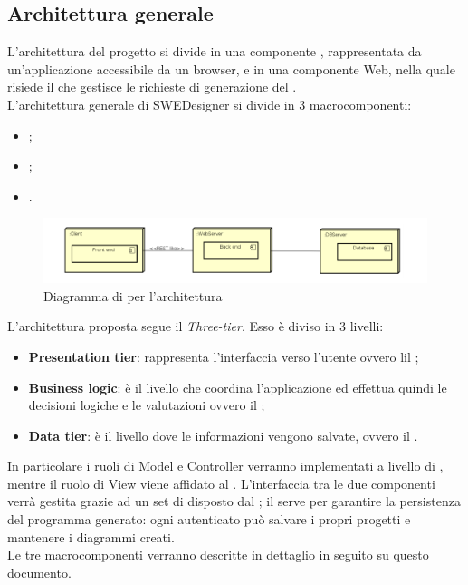 	\subsection{Architettura generale}
	\label{3.2}
	L'architettura del progetto si divide in una componente , rappresentata da un'applicazione
 accessibile da un browser, e in una componente Web, nella quale risiede il  che gestisce le richieste di generazione del .\\
L'architettura generale di SWEDesigner si divide in 3 macrocomponenti:
\begin{itemize}
\item \textbf{};
\item \textbf{ };
\item \textbf{}.
\end{itemize}

 \begin{figure}[h!]
\centering
\includegraphics[scale=0.4]{Disegnetti/architetturaGenerale.png}
\caption{Diagramma di  per l'architettura}
 \end{figure}

L'architettura proposta segue il  \emph{Three-tier}. Esso è diviso in 3 livelli: 
\begin{itemize}
\item \textbf{Presentation tier}: rappresenta l'interfaccia verso l'utente ovvero lil ;
\item \textbf{Business logic}: è il livello che coordina l'applicazione ed effettua quindi le decisioni logiche e le valutazioni ovvero il ;
\item \textbf{Data tier}: è il livello dove le informazioni vengono salvate, ovvero il .
\end{itemize}


In particolare i ruoli di Model e Controller verranno implementati a livello di , mentre il ruolo di View viene affidato al . L'interfaccia tra le due componenti verrà gestita grazie ad un set di  disposto dal  ; il  serve per garantire la persistenza del programma generato: ogni  autenticato può salvare i propri progetti e mantenere i diagrammi creati.\\
Le tre macrocomponenti verranno descritte in dettaglio in seguito su questo documento.
